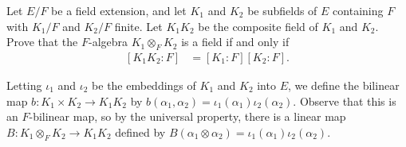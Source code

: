 \documentclass[10pt]{mypackage}
\begin{document}
\begin{problem}[Problem 7]
  Let $E/F$ be a field extension, and let $K_1$ and $K_2$ be subfields of $E$ containing $F$ with $K_1/F$ and $K_2/F$ finite. Let $K_1K_2$ be the composite field of $K_1$ and $K_2$. Prove that the $F$-algebra $K_1\otimes_{F}K_2$ is a field if and only if
  \begin{align*}
    \left[ K_1K_2:F \right] &= \left[ K_1:F \right]\left[ K_2:F \right].
  \end{align*}
\end{problem}
\begin{solution}
  Letting $\iota_1$ and $\iota_2$ be the embeddings of $K_1$ and $K_2$ into $E$, we define the bilinear map $b\colon K_1\times K_2\rightarrow K_1K_2$ by $b\left( \alpha_1,\alpha_2 \right) = \iota_1\left( \alpha_1 \right)\iota_2\left( \alpha_2 \right)$. Observe that this is an $F$-bilinear map, so by the universal property, there is a linear map $ B\colon K_1\otimes_{F}K_2\rightarrow K_1K_2 $ defined by $B\left( \alpha_1\otimes \alpha_2 \right) = \iota_1\left( \alpha_1 \right)\iota_2\left( \alpha_2 \right)$. 


\end{solution}
\end{document}

